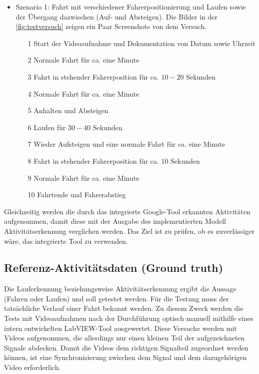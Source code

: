 \begin{itemize}
	\item Szenario 1: Fahrt mit verschiedener Fahrerpositionierung und Laufen sowie der Übergang dazwischen (Auf- und Absteigen). Die Bilder in der \autoref{fig:testversuch} zeigen ein Paar Screenshots von dem Versuch.
	\begin{itemize}
		\item[1] Start der Videoaufnahme und Dokumentation von Datum sowie Uhrzeit
		\item[2] Normale Fahrt für ca. eine Minute
		\item[3] Fahrt in stehender Fahrerposition für ca. $10-20$ Sekunden
		\item[4] Normale Fahrt für ca. eine Minute
		\item[5] Anhalten und Absteigen
		\item[6] Laufen für $30-40$ Sekunden
		\item[7] Wieder Aufsteigen und eine normale Fahrt für ca. eine Minute
		\item[8] Fahrt in stehender Fahrerposition für ca. 10 Sekunden
		\item[9] Normale Fahrt für ca. eine Minute
		\item[10] Fahrtende und Fahrerabstieg
	\end{itemize}
\end{itemize}
Gleichzeitig werden die durch das integrierte Google-Tool erkannten Aktivitäten aufgenommen, damit diese mit der Ausgabe des implementierten Modell \glqq Aktivitäts\-erke\-nnung\grqq{} verglichen werden. Das Ziel ist zu prüfen, ob es zuverlässiger wäre, das integrierte Tool zu verwenden.


\subsection{Referenz-Aktivitätsdaten (Ground truth)}

Die Lauferkennung beziehungsweise Aktivitätserkennung ergibt die Aussage (Fahren oder Laufen) und soll getestet werden. Für die Testung muss der tatsächliche Verlauf einer Fahrt bekannt werden. Zu diesem Zweck werden die Tests mit Videoaufnahmen nach der Durchführung optisch manuell mithilfe eines intern entwickelten LabVIEW-Tool ausgewertet. Diese Versuche werden mit Videos aufgenommen, die allerdings nur einen kleinen Teil der aufgezeichneten Signale abdecken. Damit die Videos dem richtigen Signalteil zugeordnet werden können, ist eine Synchronisierung zwischen dem Signal und dem dazugehörigen Video erforderlich. 

